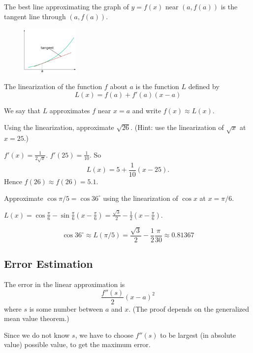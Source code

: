 \documentclass[../calc1-main.tex]{subfiles}
\begin{document}
The best line approximating the graph of $y=f(x)$ near $(a, f(a))$ is the tangent line through $(a, f(a))$.

\begin{figure}[H]
  \centering
  \includegraphics[width=0.25\textwidth]{figures/4-7-lin-approx.png}
\end{figure}

The linearization of the function $f$ about $a$ is the function $L$ defined by
\[
  L(x) = f(a) + f'(a)(x-a)
\]

We say that $L$ approximates $f$ near $x=a$ and write $f(x) \approx L(x)$.

\begin{example}
  Using the linearization, approximate $\sqrt{26}$. (Hint: use the linearization of $\sqrt{x}$ at $x=25$.)
\end{example}
\begin{solution}
  $f'(x) = \frac{1}{2\sqrt{x}}$. $f'(25) = \frac{1}{10}$. So
  \[
    L(x) = 5 + \frac{1}{10} (x-25).
  \]
  Hence $f(26) \approx f(26) = 5.1$.
\end{solution}

\begin{example}
  Approximate $\cos \pi/5 = \cos 36^{\circ}$ using the linearization of $\cos x$ at $x=\pi/6$.
\end{example}

\begin{solution}
  $L(x) = \cos\frac{\pi}{6} - \sin \frac{\pi}{6}(x-\frac{\pi}{6}) = \frac{\sqrt{3}}{2} - \frac{1}{2}(x-\frac{\pi}{6})$.

  \[
    \cos 36^{\circ} \approx L(\pi/5) = \frac{\sqrt{3}}{2} - \frac{1}{2} \frac{\pi}{30} \approx 0.81367
  \]
\end{solution}

\subsection*{Error Estimation}
The error in the linear approximation is
\[
  \frac{f''(s)}{2}(x-a)^2
\]
where $s$ is some number between $a$ and $x$. (The proof depends on the generalized mean value theorem.)

Since we do not know $s$, we have to choose $f''(s)$ to be largest (in absolute value) possible value, to get the maximum error.
\end{document}
